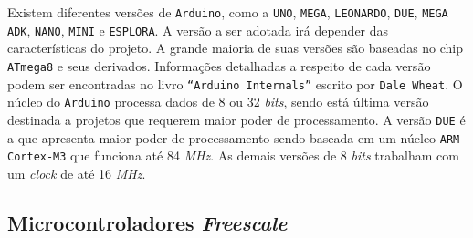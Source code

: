 Existem diferentes versões de \texttt{Arduino}, como a \texttt{UNO}, \texttt{MEGA}, \texttt{LEONARDO}, \texttt{DUE}, \texttt{MEGA ADK}, \texttt{NANO}, \texttt{MINI} e \texttt{ESPLORA}. A versão a ser adotada irá depender das características do projeto. A grande maioria de suas versões são baseadas no chip \texttt{ATmega8} e seus derivados. Informações detalhadas a respeito de cada versão podem ser encontradas no livro \texttt{“Arduino Internals”} escrito por \texttt{Dale Wheat}. O núcleo do \texttt{Arduino} processa dados de 8 ou 32 \textit{bits}, sendo está última versão destinada a projetos que requerem maior poder de processamento. A versão \texttt{DUE} é a que apresenta maior poder de processamento sendo baseada em um núcleo \texttt{ARM Cortex-M3} que funciona até 84 \textit{MHz}. As demais versões de 8 \textit{bits} trabalham com um \textit{clock} de até 16 \textit{MHz}.

\subsection{Microcontroladores \textit{Freescale}}

